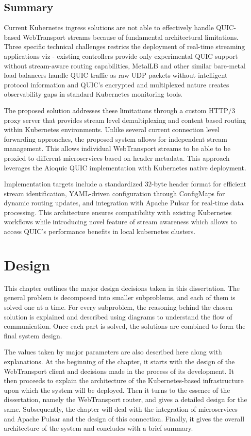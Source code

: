 \section{Summary}
Current Kubernetes ingress solutions are not able to effectively handle QUIC-based WebTransport streams because of fundamental architectural limitations. Three specific technical challenges restrics the deployment of real-time streaming applications viz - existing controllers provide only experimental QUIC support without stream-aware routing capabilities, MetalLB and other similar bare-metal load balancers handle QUIC traffic as raw UDP packets without intelligent protocol information and QUIC's encrypted and multiplexed nature creates observability gaps in standard Kubernetes monitoring tools.

The proposed solution addresses these limitations through a custom HTTP/3 proxy server that provides stream level demultiplexing and content based routing within Kubernetes environments. Unlike several current connection level forwarding approaches, the proposed system allows for independent stream management. This allows individual WebTransport streams to be able to be proxied to different microservices based on header metadata. This approach leverages the Aioquic QUIC implementation with Kubernetes native deployment.

Implementation targets include a standardized 32-byte header format for efficient stream identification, YAML-driven configuration through ConfigMaps for dynamic routing updates, and integration with Apache Pulsar for real-time data processing. This architecture ensures compatibility with existing Kubernetes workflows while introducing novel feature of stream awareness which allows to access QUIC's performance benefits in local kubernetes clusters.


\chapter{Design}
\label{chap:Design}

This chapter outlines the major design decisions taken in this dissertation. The general problem is decomposed into smaller subproblems, and each of them is solved one at a time. For every subproblem, the reasoning behind the chosen solution is explained and described using diagrams to understand the flow of communication. Once each part is solved, the solutions are combined to form the final system design.

The values taken by major parameters are also described here along with explanations. At the beginning of the chapter, it starts with the design of the WebTransport client and decisions made in the process of its development. It then proceeds to explain the architecture of the Kubernetes-based infrastructure upon which the system will be deployed. Then it turns to the essence of the dissertation, namely the WebTransport router, and gives a detailed design for the same. Subsequently, the chapter will deal with the integration of microservices and Apache Pulsar and the design of this connection. Finally, it gives the overall architecture of the system and concludes with a brief summary.



